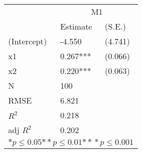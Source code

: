 \begin{tabular}{*{3}{l}}
\hline
                  & \multicolumn{2}{c}{M1}   \tabularnewline
                   &Estimate  &(S.E.)  \tabularnewline
 \hline
 \hline
   (Intercept)     &-4.550   &   (4.741) \tabularnewline
   x1              &0.267***   &   (0.066) \tabularnewline
   x2              &0.220***   &   (0.063) \tabularnewline
 \hline
 N                 &100       &        \tabularnewline
 RMSE             &6.821         & \tabularnewline
 $R^2$             &0.218         & \tabularnewline
 adj $R^2$         &0.202         & \tabularnewline
 \hline
\hline
 
 \multicolumn{3}{c}{${*  p}\le 0.05$${*\!\!*  p}\le 0.01$${*\!\!*\!\!*  p}\le 0.001$}\tabularnewline
 \end{tabular}
